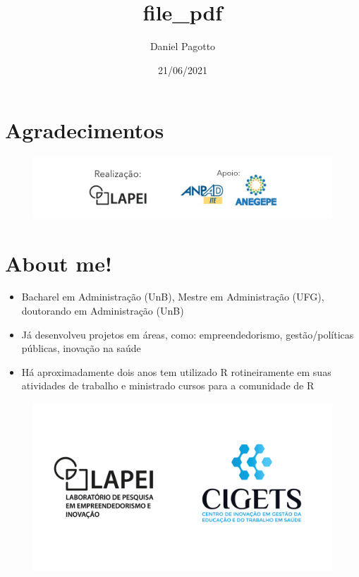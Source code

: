 \documentclass[
]{article}
\title{file\_pdf}
\author{Daniel Pagotto}
\date{21/06/2021}
\providecommand{\tightlist}{%
  \setlength{\itemsep}{0pt}\setlength{\parskip}{0pt}}
\begin{document}
\maketitle

\hypertarget{agradecimentos}{%
\section{Agradecimentos}\label{agradecimentos}}

\begin{figure}

{\centering \includegraphics[width=1\linewidth,height=1\textheight]{imagem/agradecimentos} 

}

\caption{ }\label{fig:agradecimentos, figures-side}
\end{figure}

\hypertarget{about-me}{%
\section{About me!}\label{about-me}}

\begin{itemize}
\tightlist
\item
  Bacharel em Administração (UnB), Mestre em Administração (UFG),
  doutorando em Administração (UnB)
\item
  Já desenvolveu projetos em áreas, como: empreendedorismo,
  gestão/políticas públicas, inovação na saúde
\item
  Há aproximadamente dois anos tem utilizado R rotineiramente em suas
  atividades de trabalho e ministrado cursos para a comunidade de R
\end{itemize}

\begin{figure}

{\centering \includegraphics[width=0.75\linewidth,height=0.65\textheight]{imagem/logos-lape-cigets} 

}

\caption{ }\label{fig:gatas, figures-side}
\end{figure}
\end{document}
